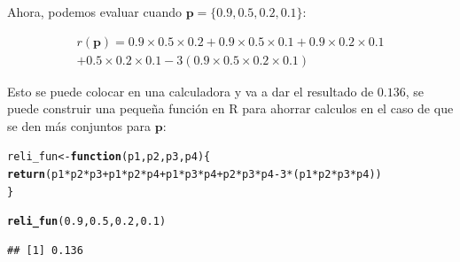 \documentclass[12pt]{article}\usepackage[]{graphicx}\usepackage[]{xcolor}
\makeatletter
\newcommand{\hlnum}[1]{\textcolor[rgb]{0.686,0.059,0.569}{#1}}%
\newcommand{\hlopt}[1]{\textcolor[rgb]{0,0,0}{#1}}%
\newcommand{\hldef}[1]{\textcolor[rgb]{0.345,0.345,0.345}{#1}}%
\newcommand{\hlkwa}[1]{\textcolor[rgb]{0.161,0.373,0.58}{\textbf{#1}}}%
\newcommand{\hlkwb}[1]{\textcolor[rgb]{0.69,0.353,0.396}{#1}}%
\newcommand{\hlkwc}[1]{\textcolor[rgb]{0.333,0.667,0.333}{#1}}%
\newcommand{\hlkwd}[1]{\textcolor[rgb]{0.737,0.353,0.396}{\textbf{#1}}}%
\newenvironment{kframe}{%
 \def\at@end@of@kframe{}%
 \ifinner\ifhmode%
  \def\at@end@of@kframe{\end{minipage}}%
  \begin{minipage}{\columnwidth}%
 \fi\fi%
 \def\FrameCommand##1{\hskip\@totalleftmargin \hskip-\fboxsep
 \colorbox{shadecolor}{##1}\hskip-\fboxsep
     \hskip-\linewidth \hskip-\@totalleftmargin \hskip\columnwidth}%
 \MakeFramed {\advance\hsize-\width
   \@totalleftmargin\z@ \linewidth\hsize
   \@setminipage}}%
 {\par\unskip\endMakeFramed%
 \at@end@of@kframe}
\newenvironment{knitrout}{}{} %
\makeatother
\begin{document}
Ahora, podemos evaluar cuando $\mathbf{p} = \{0.9, 0.5, 0.2, 0.1 \}$:

\[
  \begin{aligned}
    r(\mathbf{p}) = 0.9 \times 0.5 \times 0.2 + 0.9 \times 0.5\times 0.1 + 0.9 \times 0.2 \times 0.1 \\ + 0.5\times 0.2 \times 0.1 - 3( 0.9\times 0.5 \times  0.2\times  0.1 )
  \end{aligned}
\]

Esto se puede colocar en una calculadora y va a dar el resultado de $\mathbf{0.136}$, se puede construir una pequeña función en \textsf{R} para ahorrar calculos en el caso de que se den más conjuntos para $\mathbf{p}$:

\begin{knitrout}
\color{fgcolor}\begin{kframe}
\begin{alltt}
\hldef{reli_fun} \hlkwb{<-} \hlkwa{function}\hldef{(}\hlkwc{p1}\hldef{,} \hlkwc{p2}\hldef{,} \hlkwc{p3}\hldef{,} \hlkwc{p4}\hldef{)\{}
  \hlkwd{return} \hldef{(p1}\hlopt{*}\hldef{p2}\hlopt{*}\hldef{p3} \hlopt{+} \hldef{p1}\hlopt{*}\hldef{p2}\hlopt{*}\hldef{p4} \hlopt{+} \hldef{p1}\hlopt{*}\hldef{p3}\hlopt{*}\hldef{p4} \hlopt{+} \hldef{p2}\hlopt{*}\hldef{p3}\hlopt{*}\hldef{p4} \hlopt{-} \hlnum{3} \hlopt{*} \hldef{(p1} \hlopt{*} \hldef{p2} \hlopt{*} \hldef{p3} \hlopt{*} \hldef{p4))}
\hldef{\}}

\hlkwd{reli_fun}\hldef{(}\hlnum{0.9}\hldef{,} \hlnum{0.5}\hldef{,} \hlnum{0.2}\hldef{,} \hlnum{0.1}\hldef{)}
\end{alltt}
\begin{verbatim}
## [1] 0.136
\end{verbatim}
\end{kframe}
\end{knitrout}
\end{document}
